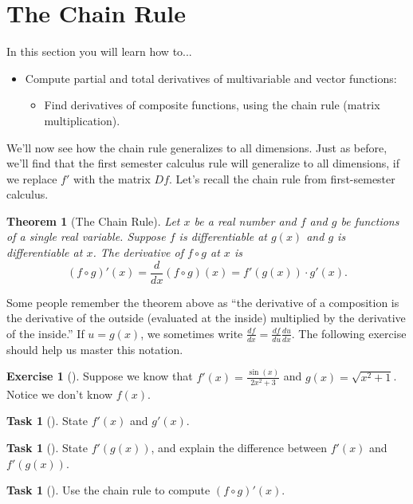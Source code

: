 \documentclass[10pt,]{book}
\theoremstyle{plain}
\newtheorem{theorem}{Theorem}[section]
\theoremstyle{definition}
\theoremstyle{definition}
\theoremstyle{definition}
\theoremstyle{definition}
\newtheorem{exploration}[project]{Exercise}
\newtheorem{task}[project]{Task}
\theoremstyle{definition}
\numberwithin{equation}{section}
\newcommand{\ds}{\displaystyle}
\begin{document}
\section[{The Chain Rule}]{The Chain Rule}\label{section-23}
In this section you will learn how to...%
\leavevmode%
\begin{itemize}[label=\textbullet]
\item{}Compute partial and total derivatives of multivariable and vector functions:%
%
\begin{itemize}[label=$\circ$]
\item{}Find derivatives of composite functions, using the chain rule (matrix multiplication).%
\end{itemize}
\end{itemize}
We'll now see how the chain rule generalizes to all dimensions. Just as before, we'll find that the first semester calculus rule will generalize to all dimensions, if we replace \(f'\) with the matrix \(Df\). Let's recall the chain rule from first-semester calculus.%
\begin{theorem}[{The Chain Rule}]\label{theorem-2}
Let \(x\) be a real number and \(f\) and \(g\) be functions of a single real variable. Suppose \(f\) is differentiable at \(g(x)\) and \(g\) is differentiable at \(x\). The derivative of \(f\circ g\) at \(x\) is%
\begin{equation*}
(f\circ g)'(x) = \frac{d}{dx}(f\circ g)(x) = f'(g(x))\cdot g'(x).
\end{equation*}
%
\end{theorem}
Some people remember the theorem above as ``the derivative of a composition is the derivative of the outside (evaluated at the inside) multiplied by the derivative of the inside.'' If \(u=g(x)\), we sometimes write \(\ds \frac{df}{dx}=\frac{df}{du}\frac{du}{dx}\). The following exercise should help us master this notation.%
\begin{exploration}[]\label{prob_chain_rule_review}
Suppose we know that \(\ds f'(x) = \frac{\sin(x)}{2x^2+3}\) and \(g(x)=\sqrt{x^2+1}\). Notice we don't know \(f(x)\). %
\begin{task}[]\label{task-333}
State \(f'(x)\) and \(g'(x)\).%
\end{task}
\begin{task}[]\label{task-334}
State \(f'(g(x))\), and explain the difference between \(f'(x)\) and \(f'(g(x))\).%
\end{task}
\begin{task}[]\label{task-335}
Use the chain rule to compute \((f\circ g)'(x)\).%
\end{task}
\end{exploration}
\end{document}
